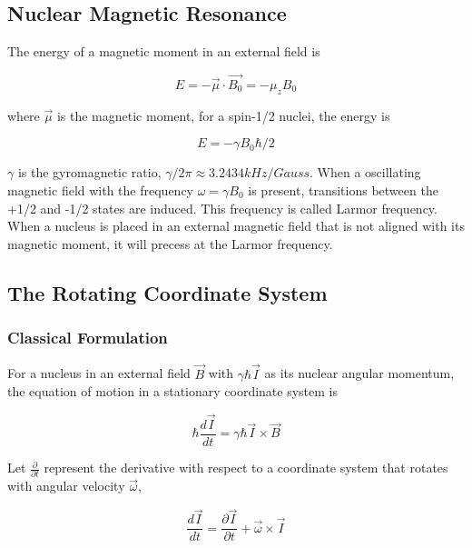\subsection{Nuclear Magnetic Resonance}

The energy of a magnetic moment in an external field is

\begin{equation}
E = -\vec{\mu}\cdot \vec{B_{0}} = -\mu_{z}B_{0}
\end{equation}

where $\vec{\mu}$ is the magnetic moment, for a spin-1/2 nuclei, the energy is

\begin{equation}
E = -\gamma B_{0}\hbar/2
\end{equation}

$\gamma$ is the gyromagnetic ratio, $\gamma /2\pi \approx 3.2434kHz/Gauss$. When a oscillating magnetic field with the frequency $\omega=\gamma B_{0}$ is present, transitions between the +1/2 and -1/2 states are induced. This frequency is called Larmor frequency. When a nucleus is placed in an external magnetic field that is not aligned with its magnetic moment, it will precess at the Larmor frequency.

\subsection{The Rotating Coordinate System}

\subsubsection{Classical Formulation}

For a nucleus in an external field $\vec{B}$ with $\gamma \hbar \vec{I}$ as its nuclear angular momentum, the equation of motion in a stationary coordinate system is \cite{RevModPhys.26.167}

\begin{equation}\label{eq1}
\hbar \frac{d\vec{I}}{dt}=\gamma \hbar \vec{I} \times \vec{B}
\end{equation}

Let $\frac{\partial}{\partial t}$ represent the derivative with respect to a coordinate system that rotates with angular velocity $\vec{\omega}$,

\begin{equation}\label{eq2}
\frac{d\vec{I}}{dt}=\frac{\partial \vec{I}}{\partial t}+\vec{\omega} \times \vec{I}
\end{equation}

